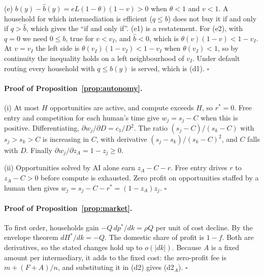 \documentclass[12pt]{article}
\theoremstyle{remark}
\begin{document}
(e) $b(y)-\hat b(y)=eL(1-\theta)(1-v)>0$ when $\theta<1$ and $v<1$. A household for which intermediation is efficient ($q\le b$) does not buy it if and only if $q>\hat b$, which gives the ``if and only if''. (e1) is a restatement. For (e2), with $q=0$ we need $0\le b$, true for $v<v_I$, and $\hat b<0$, which is $\theta(v)(1-v)<1-v_I$. At $v=v_I$ the left side is $\theta(v_I)(1-v_I)<1-v_I$ when $\theta(v_I)<1$, so by continuity the inequality holds on a left neighbourhood of $v_I$. Under default routing every household with $q\le b(y)$ is served, which is (d1). $\square$

\paragraph{Proof of Proposition~\ref{prop:autonomy}.}
(i) At most $H$ opportunities are active, and compute exceeds $H$, so $r^*=0$. Free entry and competition for each human's time give $w_j=s_j-C$ when this is positive. Differentiating, $\partial w_j/\partial D=c_1/D^2$. The ratio $(s_j-C)/(s_k-C)$ with $s_j>s_k>C$ is increasing in $C$, with derivative $(s_j-s_k)/(s_k-C)^2$, and $C$ falls with $D$. Finally $\partial w_j/\partial z_A=1-z_j\ge0$.

(ii) Opportunities solved by AI alone earn $z_A-C-r$. Free entry drives $r$ to $z_A-C>0$ before compute is exhausted. Zero profit on opportunities staffed by a human then gives $w_j=s_j-C-r^*=(1-z_A)z_j$. $\square$

\paragraph{Proof of Proposition~\ref{prop:market}.} To first order, households gain $-Q\,dp^*/dk=\rho Q$ per unit of cost decline. By the envelope theorem $d\Pi^*/dk=-Q$. The domestic share of profit is $1-f$. Both are derivatives, so the stated changes hold up to $o(|dk|)$. Because $A$ is a fixed amount per intermediary, it adds to the fixed cost: the zero-profit fee is $m+(F+A)/n$, and substituting it in (d2) gives (d2$_A$). $\square$
\end{document}

